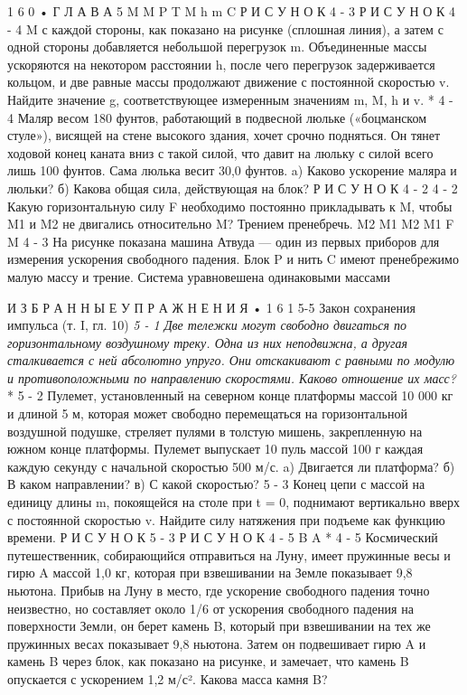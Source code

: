 \documentclass[10pt,oneside]{article}
\begin{document}
1 6 0 • Г Л А В А  5 M M P T M h m C Р И С У Н О К  4 - 3 Р И С У Н О К  4 - 4 M с каждой стороны, как показано на рисунке (сплошная линия), а затем с одной стороны добавляется небольшой перегрузок m. Объединенные массы ускоряются на некотором расстоянии h, после чего перегрузок задерживается кольцом, и две равные массы продолжают движение с постоянной скоростью v. Найдите значение g, соответствующее измеренным значениям m, M, h и v. \emph{ } * 4 - 4 Маляр весом 180 фунтов, работающий в подвесной люльке («боцманском стуле»), висящей на стене высокого здания, хочет срочно подняться. Он тянет ходовой конец каната вниз с такой силой, что давит на люльку с силой всего лишь 100 фунтов. Сама люлька весит 30,0 фунтов. a) Каково ускорение маляра и люльки? б) Какова общая сила, действующая на блок? Р И С У Н О К  4 - 2 \emph{ } 4 - 2 Какую горизонтальную силу F необходимо постоянно прикладывать к M, чтобы M1 и M2 не двигались относительно M? Трением пренебречь. M2 M1 M2 M1 F M \emph{ } 4 - 3 На рисунке показана машина Атвуда --- один из первых приборов для измерения ускорения свободного падения. Блок P и нить C имеют пренебрежимо малую массу и трение. Система уравновешена одинаковыми массами\par

И З Б Р А Н Н Ы Е  У П Р А Ж Н Е Н И Я • 1 6 1 5-5 Закон сохранения импульса (т. I, гл. 10) \emph{ 5 - 1 Две тележки могут свободно двигаться по горизонтальному воздушному треку. Одна из них неподвижна, а другая сталкивается с ней абсолютно упруго. Они отскакивают с равными по модулю и противоположными по направлению скоростями. Каково отношение их масс? } * 5 - 2 Пулемет, установленный на северном конце платформы массой 10 000 кг и длиной 5 м, которая может свободно перемещаться на горизонтальной воздушной подушке, стреляет пулями в толстую мишень, закрепленную на южном конце платформы. Пулемет выпускает 10 пуль массой 100 г каждая каждую секунду с начальной скоростью 500 м/с. a) Двигается ли платформа? б) В каком направлении? в) С какой скоростью? \emph{ } 5 - 3 Конец цепи с массой на единицу длины m, покоящейся на столе при t = 0, поднимают вертикально вверх с постоянной скоростью v. Найдите силу натяжения при подъеме как функцию времени. Р И С У Н О К  5 - 3 Р И С У Н О К  4 - 5 B A \emph{ } * 4 - 5 Космический путешественник, собирающийся отправиться на Луну, имеет пружинные весы и гирю A массой 1,0 кг, которая при взвешивании на Земле показывает 9,8 ньютона. Прибыв на Луну в место, где ускорение свободного падения точно неизвестно, но составляет около 1/6 от ускорения свободного падения на поверхности Земли, он берет камень B, который при взвешивании на тех же пружинных весах показывает 9,8 ньютона. Затем он подвешивает гирю A и камень B через блок, как показано на рисунке, и замечает, что камень B опускается с ускорением 1,2 м/с². Какова масса камня B?\par
\end{document}
